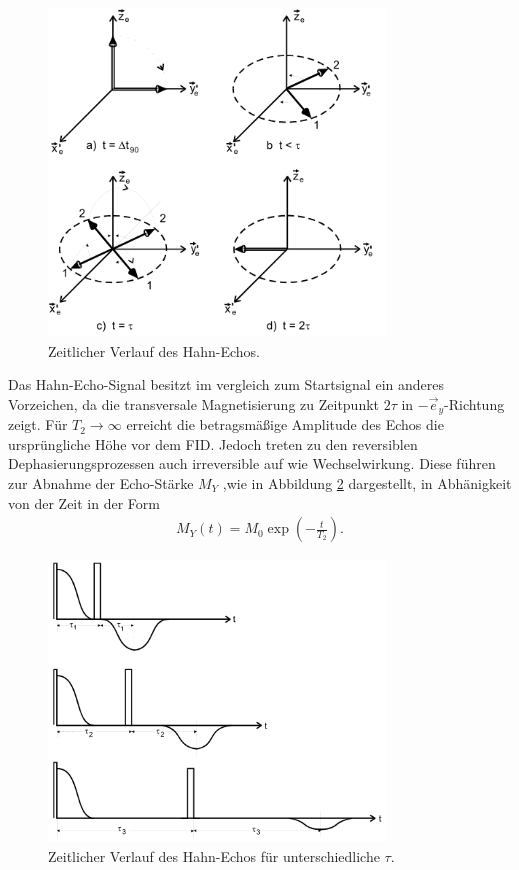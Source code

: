 \begin{itemize}
\begin{figure}
  \includegraphics[width=0.8\textwidth]{spin-echo.PNG}
  \caption{Zeitlicher Verlauf des Hahn-Echos.\cite{sample}}
  \label{fig:spin-echo}
\end{figure}

Das Hahn-Echo-Signal besitzt im vergleich zum Startsignal
ein anderes Vorzeichen, da die transversale
Magnetisierung zu Zeitpunkt $2\tau$ in $-\vec{e}_y$-Richtung zeigt.
Für $T_2\rightarrow\infty$ erreicht die betragsmäßige
Amplitude des Echos die
ursprüngliche Höhe vor dem FID.
Jedoch treten zu den reversiblen Dephasierungsprozessen auch
irreversible auf wie Wechselwirkung. Diese führen zur Abnahme der Echo-Stärke $M_Y$
,wie in Abbildung \ref{fig:tau_ver} dargestellt,
in Abhänigkeit von der Zeit in der Form
\begin{align}
  M_Y(t)=M_0 \exp\left(-\frac{t}{T_2}\right).\label{eqn:t2}
\end{align}

\begin{figure}
  \includegraphics[width=0.8\textwidth]{tau_ver.PNG}
  \caption{Zeitlicher Verlauf des Hahn-Echos für unterschiedliche $\tau$.\cite{sample}}
  \label{fig:tau_ver}
\end{figure}


\end{itemize}
